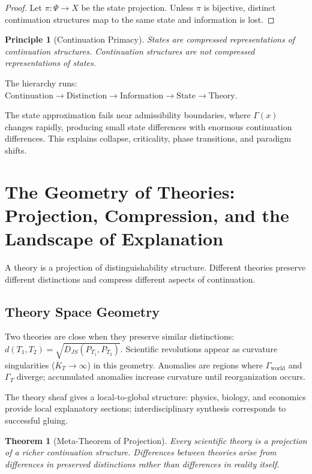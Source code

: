 \documentclass[12pt,a4paper]{article}
\newtheorem{theorem}{Theorem}[section]
\newtheorem*{principle}{Principle}
\begin{document}
\begin{proof}
Let $\pi : \Psi \to X$ be the state projection. Unless $\pi$ is bijective, distinct continuation structures map to the same state and information is lost.
\end{proof}

\begin{principle}[Continuation Primacy]
States are compressed representations of continuation structures. Continuation structures are not compressed representations of states.
\end{principle}

The hierarchy runs: $\text{Continuation} \to \text{Distinction} \to \text{Information} \to \text{State} \to \text{Theory}$.

The state approximation fails near admissibility boundaries, where $\Gamma(x)$ changes rapidly, producing small state differences with enormous continuation differences. This explains collapse, criticality, phase transitions, and paradigm shifts.

\section{The Geometry of Theories: Projection, Compression, and the Landscape of Explanation}

A theory is a projection of distinguishability structure. Different theories preserve different distinctions and compress different aspects of continuation.

\subsection{Theory Space Geometry}

Two theories are close when they preserve similar distinctions: $d(T_1, T_2) = \sqrt{D_{JS}(P_{T_1}, P_{T_2})}$. Scientific revolutions appear as curvature singularities ($K_T \to \infty$) in this geometry. Anomalies are regions where $\Gamma_{\mathrm{world}}$ and $\Gamma_T$ diverge; accumulated anomalies increase curvature until reorganization occurs.

The theory sheaf gives a local-to-global structure: physics, biology, and economics provide local explanatory sections; interdisciplinary synthesis corresponds to successful gluing.

\begin{theorem}[Meta-Theorem of Projection]
Every scientific theory is a projection of a richer continuation structure. Differences between theories arise from differences in preserved distinctions rather than differences in reality itself.
\end{theorem}
\end{document}
